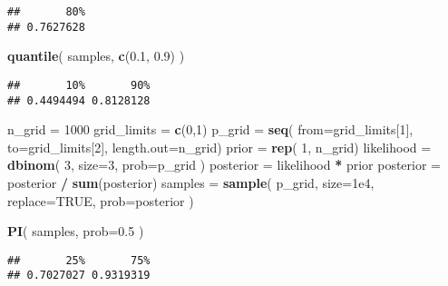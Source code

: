 \documentclass[
]{book}
\newenvironment{Shaded}{\begin{snugshade}}{\end{snugshade}}
\newcommand{\DataTypeTok}[1]{\textcolor[rgb]{0.13,0.29,0.53}{#1}}
\newcommand{\DecValTok}[1]{\textcolor[rgb]{0.00,0.00,0.81}{#1}}
\newcommand{\FloatTok}[1]{\textcolor[rgb]{0.00,0.00,0.81}{#1}}
\newcommand{\KeywordTok}[1]{\textcolor[rgb]{0.13,0.29,0.53}{\textbf{#1}}}
\newcommand{\NormalTok}[1]{#1}
\newcommand{\OperatorTok}[1]{\textcolor[rgb]{0.81,0.36,0.00}{\textbf{#1}}}
\newcommand{\OtherTok}[1]{\textcolor[rgb]{0.56,0.35,0.01}{#1}}
\newcommand{\StringTok}[1]{\textcolor[rgb]{0.31,0.60,0.02}{#1}}
\begin{document}
\begin{verbatim}
##       80% 
## 0.7627628
\end{verbatim}

\begin{Shaded}
\begin{Highlighting}[]
\KeywordTok{quantile}\NormalTok{( samples, }\KeywordTok{c}\NormalTok{(}\FloatTok{0.1}\NormalTok{, }\FloatTok{0.9}\NormalTok{) )}
\end{Highlighting}
\end{Shaded}

\begin{verbatim}
##       10%       90% 
## 0.4494494 0.8128128
\end{verbatim}

\begin{Shaded}
\begin{Highlighting}[]
\NormalTok{n_grid =}\StringTok{ }\DecValTok{1000}
\NormalTok{grid_limits =}\StringTok{ }\KeywordTok{c}\NormalTok{(}\DecValTok{0}\NormalTok{,}\DecValTok{1}\NormalTok{)}
\NormalTok{p_grid =}\StringTok{ }\KeywordTok{seq}\NormalTok{( }\DataTypeTok{from=}\NormalTok{grid_limits[}\DecValTok{1}\NormalTok{], }\DataTypeTok{to=}\NormalTok{grid_limits[}\DecValTok{2}\NormalTok{], }\DataTypeTok{length.out=}\NormalTok{n_grid)}
\NormalTok{prior =}\StringTok{ }\KeywordTok{rep}\NormalTok{( }\DecValTok{1}\NormalTok{, n_grid)}
\NormalTok{likelihood =}\StringTok{ }\KeywordTok{dbinom}\NormalTok{( }\DecValTok{3}\NormalTok{, }\DataTypeTok{size=}\DecValTok{3}\NormalTok{, }\DataTypeTok{prob=}\NormalTok{p_grid )}
\NormalTok{posterior =}\StringTok{ }\NormalTok{likelihood }\OperatorTok{*}\StringTok{ }\NormalTok{prior}
\NormalTok{posterior =}\StringTok{ }\NormalTok{posterior }\OperatorTok{/}\StringTok{ }\KeywordTok{sum}\NormalTok{(posterior)}
\NormalTok{samples =}\StringTok{ }\KeywordTok{sample}\NormalTok{( p_grid, }\DataTypeTok{size=}\FloatTok{1e4}\NormalTok{, }\DataTypeTok{replace=}\OtherTok{TRUE}\NormalTok{, }\DataTypeTok{prob=}\NormalTok{posterior )}
\end{Highlighting}
\end{Shaded}

\begin{Shaded}
\begin{Highlighting}[]
\KeywordTok{PI}\NormalTok{( samples, }\DataTypeTok{prob=}\FloatTok{0.5}\NormalTok{ )}
\end{Highlighting}
\end{Shaded}

\begin{verbatim}
##       25%       75% 
## 0.7027027 0.9319319
\end{verbatim}
\end{document}
